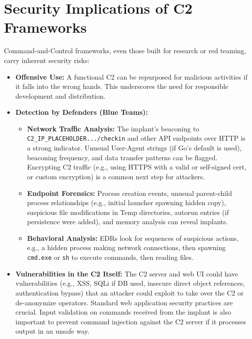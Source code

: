 \section{Security Implications of C2 Frameworks}
Command-and-Control frameworks, even those built for research or red teaming, carry inherent security risks:
\begin{itemize}
    \item \textbf{Offensive Use:} A functional C2 can be repurposed for malicious activities if it falls into the wrong hands. This underscores the need for responsible development and distribution.
    \item \textbf{Detection by Defenders (Blue Teams):}
        \begin{itemize}
            \item \textbf{Network Traffic Analysis:} The implant's beaconing to \verb|C2_IP_PLACEHOLDER.../checkin| and other API endpoints over HTTP is a strong indicator. Unusual User-Agent strings (if Go's default is used), beaconing frequency, and data transfer patterns can be flagged. Encrypting C2 traffic (e.g., using HTTPS with a valid or self-signed cert, or custom encryption) is a common next step for attackers.
            \item \textbf{Endpoint Forensics:} Process creation events, unusual parent-child process relationships (e.g., initial launcher spawning hidden copy), suspicious file modifications in Temp directories, autorun entries (if persistence were added), and memory analysis can reveal implants.
            \item \textbf{Behavioral Analysis:} EDRs look for sequences of suspicious actions, e.g., a hidden process making network connections, then spawning \texttt{cmd.exe} or \texttt{sh} to execute commands, then reading files.
        \end{itemize}
    \item \textbf{Vulnerabilities in the C2 Itself:} The C2 server and web UI could have vulnerabilities (e.g., XSS, SQLi if DB used, insecure direct object references, authentication bypass) that an attacker could exploit to take over the C2 or de-anonymize operators. Standard web application security practices are crucial. Input validation on commands received from the implant is also important to prevent command injection against the C2 server if it processes output in an unsafe way.
\end{itemize}

